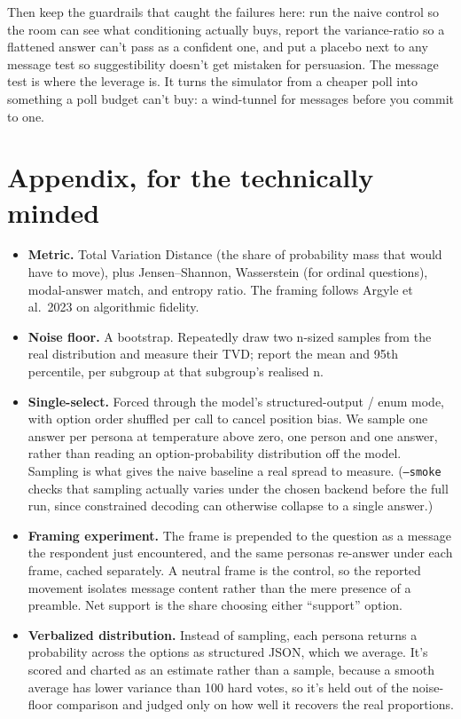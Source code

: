 \documentclass[11pt]{article}
\begin{document}
Then keep the guardrails that caught the failures here: run the naive control so the
room can see what conditioning actually buys, report the variance-ratio so a
flattened answer can't pass as a confident one, and put a placebo next to any
message test so suggestibility doesn't get mistaken for persuasion. The message test
is where the leverage is. It turns the simulator from a cheaper poll into something
a poll budget can't buy: a wind-tunnel for messages before you commit to one.

\section*{Appendix, for the technically minded}

\begin{itemize}
  \item \textbf{Metric.} Total Variation Distance (the share of probability mass that would have to move), plus Jensen--Shannon, Wasserstein (for ordinal questions), modal-answer match, and entropy ratio. The framing follows Argyle et al.\ 2023 on algorithmic fidelity.
  \item \textbf{Noise floor.} A bootstrap. Repeatedly draw two n-sized samples from the real distribution and measure their TVD; report the mean and 95th percentile, per subgroup at that subgroup's realised n.
  \item \textbf{Single-select.} Forced through the model's structured-output / enum mode, with option order shuffled per call to cancel position bias. We sample one answer per persona at temperature above zero, one person and one answer, rather than reading an option-probability distribution off the model. Sampling is what gives the naive baseline a real spread to measure. (\texttt{--smoke} checks that sampling actually varies under the chosen backend before the full run, since constrained decoding can otherwise collapse to a single answer.)
  \item \textbf{Framing experiment.} The frame is prepended to the question as a message the respondent just encountered, and the same personas re-answer under each frame, cached separately. A neutral frame is the control, so the reported movement isolates message content rather than the mere presence of a preamble. Net support is the share choosing either ``support'' option.
  \item \textbf{Verbalized distribution.} Instead of sampling, each persona returns a probability across the options as structured JSON, which we average. It's scored and charted as an estimate rather than a sample, because a smooth average has lower variance than 100 hard votes, so it's held out of the noise-floor comparison and judged only on how well it recovers the real proportions.

\end{itemize}
\end{document}
